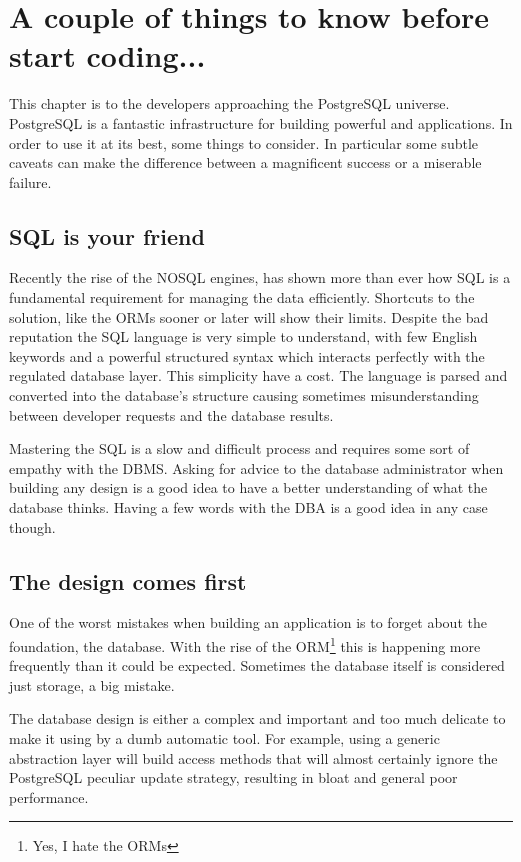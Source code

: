 \chapter{A couple of things to know before start coding...}
\label{cha:COUPLETHINGS}
This chapter is to the developers approaching the PostgreSQL universe. PostgreSQL is a fantastic
infrastructure for building powerful and applications. In order to use it at its best,  some things to
consider. In particular some subtle caveats can make the difference between a magnificent success or a
miserable failure.

\section{SQL is your friend}
Recently the rise of the NOSQL engines, has shown more than ever how SQL is a fundamental requirement for
managing the data efficiently. Shortcuts to the solution, like the ORMs sooner or later will show their
limits. Despite the bad reputation the SQL language is very simple to understand, with few English keywords
and a powerful structured syntax which interacts perfectly with the regulated database layer.
This simplicity have a cost. The language is parsed and converted into the database's structure causing
sometimes misunderstanding between developer requests and the database results.\newline

Mastering the SQL is a slow and difficult process and requires some sort of empathy with the DBMS.
Asking for advice to the database administrator when building any design is a good idea to have a better
understanding of what the database thinks. Having a few words with the DBA is a good idea in any case
though.

\section{The design comes first}
One of the worst mistakes when building an application is to forget about the foundation, the
database. With the rise of the ORM\footnote{Yes, I hate the ORMs} this is happening more frequently than it
could be expected. Sometimes the database itself is considered just storage, a big mistake.\newline

The database design is either a complex and important and too much delicate to make it using by a dumb
automatic tool. For example, using a generic abstraction layer will build access methods that will almost
certainly ignore the PostgreSQL peculiar update strategy, resulting in bloat and general poor
performance.\newline

